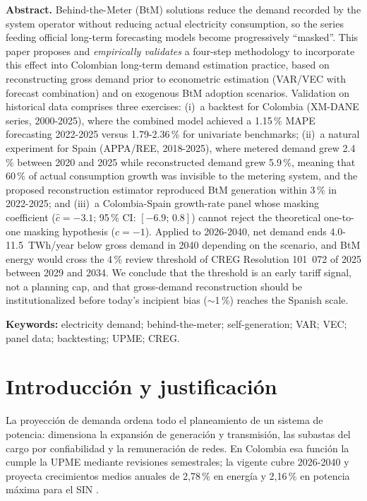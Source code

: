 \documentclass[11pt,letterpaper]{article}
\begin{document}
\medskip
\noindent\textbf{Abstract.}
Behind-the-Meter (BtM) solutions reduce the demand recorded by the system
operator without reducing actual electricity consumption, so the series
feeding official long-term forecasting models become progressively
``masked''. This paper proposes and \emph{empirically validates} a four-step
methodology to incorporate this effect into Colombian long-term demand
estimation practice, based on reconstructing gross demand prior to econometric
estimation (VAR/VEC with forecast combination) and on exogenous BtM adoption
scenarios. Validation on historical data comprises three exercises: (i)~a
backtest for Colombia (XM-DANE series, 2000-2025), where the combined model
achieved a 1.15\,\% MAPE forecasting 2022-2025 versus 1.79-2.36\,\% for
univariate benchmarks; (ii)~a natural experiment for Spain (APPA/REE,
2018-2025), where metered demand grew 2.4\,\% between 2020 and 2025 while
reconstructed demand grew 5.9\,\%, meaning that 60\,\% of actual consumption
growth was invisible to the metering system, and the proposed reconstruction
estimator reproduced BtM generation within 3\,\% in 2022-2025; and (iii)~a
Colombia-Spain growth-rate panel whose masking coefficient
($\hat{c}=-3.1$; 95\,\% CI: $[-6.9;\,0.8]$) cannot reject the theoretical
one-to-one masking hypothesis ($c=-1$). Applied to 2026-2040, net demand
ends 4.0-11.5~TWh/year below gross demand in 2040 depending on the scenario,
and BtM energy would cross the 4\,\% review threshold of CREG Resolution
101~072 of 2025 between 2029 and 2034. We conclude that the threshold is an
early tariff signal, not a planning cap, and that gross-demand
reconstruction should be institutionalized before today's incipient bias
($\sim$1\,\%) reaches the Spanish scale.

\smallskip
\noindent\textbf{Keywords:} electricity demand; behind-the-meter;
self-generation; VAR; VEC; panel data; backtesting; UPME; CREG.

\section{Introducción y justificación}

La proyección de demanda ordena todo el planeamiento de un sistema de
potencia: dimensiona la expansión de generación y transmisión, las subastas
del cargo por confiabilidad y la remuneración de redes. En Colombia esa
función la cumple la UPME mediante revisiones semestrales; la vigente cubre
2026-2040 y proyecta crecimientos medios anuales de 2,78\,\% en energía y
2,16\,\% en potencia máxima para el SIN \cite{upme2026}.
\end{document}
